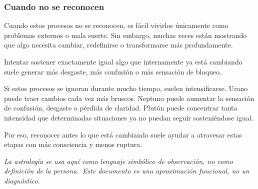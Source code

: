 \documentclass[11pt,a4paper]{article}
\begin{document}
\subsubsection*{Cuando no se reconocen}
Cuando estos procesos no se reconocen, es fácil vivirlos únicamente como problemas externos o mala suerte. Sin embargo, muchas veces están mostrando que algo necesita cambiar, redefinirse o transformarse más profundamente.

Intentar sostener exactamente igual algo que internamente ya está cambiando suele generar más desgaste, más confusión o más sensación de bloqueo.

\vspace{0.6cm}
Si estos procesos se ignoran durante mucho tiempo, suelen intensificarse. Urano puede traer cambios cada vez más bruscos. Neptuno puede aumentar la sensación de confusión, desgaste o pérdida de claridad. Plutón puede concentrar tanta intensidad que determinadas situaciones ya no puedan seguir sosteniéndose igual.

Por eso, reconocer antes lo que está cambiando suele ayudar a atravesar estas etapas con más consciencia y menos ruptura.

\vspace{1cm}
\begin{center}
{\small\itshape\color{grisai}
La astrología se usa aquí como lenguaje simbólico de observación, no como definición de la persona.\
Este documento es una aproximación funcional, no un diagnóstico.
}
\end{center}
\end{document}
